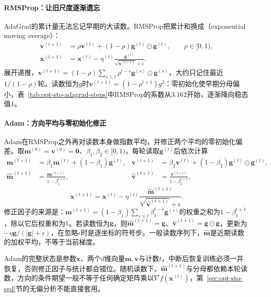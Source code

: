 \paragraph{RMSProp：让旧尺度逐渐遗忘}
AdaGrad的累计量无法忘记早期的大读数。RMSProp把累计和换成（exponential moving average）：
\[
\begin{aligned}
  \bm v^{(t+1)}&=\rho\bm v^{(t)}+(1-\rho)\bm g^{(t)}\odot\bm g^{(t)},\qquad\rho\in[0,1),\\
  \bm x^{(t+1)}&=\bm x^{(t)}-\eta^{(t)}\frac{\bm g^{(t)}}{\sqrt{\bm v^{(t+1)}}+\epsilon}.
\end{aligned}
\]
展开递推，$\bm v^{(t+1)}=(1-\rho)\sum_{s\leq t}\rho^{t-s}\bm g^{(s)}\odot\bm g^{(s)}$，大约只记住最近$1/(1-\rho)$轮。读数恒为$g$时$\bm v^{(t+1)}=(1-\rho^{t+1})g^2$：零初始化使早期分母偏小，表~\ref{tab:opt-sto-adagrad-steps}中RMSProp的系数从$3.162$开始，逐渐降向稳态值$1$。

\paragraph{Adam：方向平均与零初始化修正}
Adam在RMSProp之外再对读数本身做指数平均，并修正两个平均的零初始化偏差。取$\bm m^{(0)}=\bm v^{(0)}=\bm0$、$\beta_1,\beta_2\in[0,1)$，每轮读取$\bm g^{(t)}$后依次计算
\begin{align*}
  \bm m^{(t+1)}&=\beta_1\bm m^{(t)}+(1-\beta_1)\bm g^{(t)},&
  \bm v^{(t+1)}&=\beta_2\bm v^{(t)}+(1-\beta_2)\bm g^{(t)}\odot\bm g^{(t)},\\
  \hat{\bm m}^{(t+1)}&=\frac{\bm m^{(t+1)}}{1-\beta_1^{t+1}},&
  \hat{\bm v}^{(t+1)}&=\frac{\bm v^{(t+1)}}{1-\beta_2^{t+1}},
\end{align*}
\[
  \bm x^{(t+1)}=\bm x^{(t)}-\eta^{(t)}\frac{\hat{\bm m}^{(t+1)}}{\sqrt{\hat{\bm v}^{(t+1)}}+\epsilon}.
\]
修正因子的来源是：$\bm m^{(t+1)}=(1-\beta_1)\sum_{s\leq t}\beta_1^{t-s}\bm g^{(s)}$的权重之和为$1-\beta_1^{t+1}$，除以它后权重和为$1$。若读数恒为$\bm g$，则$\hat{\bm m}^{(t+1)}=\bm g$、$\hat{\bm v}^{(t+1)}=\bm g\odot\bm g$，更新为$-\eta\bm g/(|\bm g|+\epsilon)$，在忽略$\epsilon$时是逐坐标的符号步。一般读数序列下，$\hat{\bm m}$是近期读数的加权平均，不等于当前梯度。

Adam的完整状态是参数$\bm x$、两个$d$维向量$\bm m,\bm v$与计数$t$，中断后恢复训练必须一并恢复，否则修正因子与统计都会错位。随机读数下，$\hat{\bm m}^{(t+1)}$与分母都依赖本轮读数，方向的条件期望一般不等于任何确定矩阵乘以$\nabla f(\bm x^{(t)})$，第~\ref{sec:opt-sto-sgd}节的无偏分析不能直接套用。

